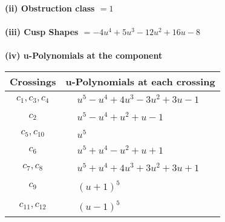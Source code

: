 \documentclass[1p]{elsarticle_modified}
\theoremstyle{definition}
\begin{document}
\flushleft \textbf{(ii) Obstruction class $= 1$}\\~\\
\flushleft \textbf{(iii) Cusp Shapes $= -4 u^4+5 u^3-12 u^2+16 u-8$}\\~\\
\newpage\renewcommand{\arraystretch}{1}
\flushleft \textbf{(iv) u-Polynomials at the component}\newline \\
\begin{tabular}{m{50pt}|m{274pt}}
Crossings & \hspace{64pt}u-Polynomials at each crossing \\
\hline $$\begin{aligned}c_{1},c_{3},c_{4}\end{aligned}$$&$\begin{aligned}
&u^5- u^4+4 u^3-3 u^2+3 u-1
\end{aligned}$\\
\hline $$\begin{aligned}c_{2}\end{aligned}$$&$\begin{aligned}
&u^5- u^4+u^2+u-1
\end{aligned}$\\
\hline $$\begin{aligned}c_{5},c_{10}\end{aligned}$$&$\begin{aligned}
&u^5
\end{aligned}$\\
\hline $$\begin{aligned}c_{6}\end{aligned}$$&$\begin{aligned}
&u^5+u^4- u^2+u+1
\end{aligned}$\\
\hline $$\begin{aligned}c_{7},c_{8}\end{aligned}$$&$\begin{aligned}
&u^5+u^4+4 u^3+3 u^2+3 u+1
\end{aligned}$\\
\hline $$\begin{aligned}c_{9}\end{aligned}$$&$\begin{aligned}
&(u+1)^5
\end{aligned}$\\
\hline $$\begin{aligned}c_{11},c_{12}\end{aligned}$$&$\begin{aligned}
&(u-1)^5
\end{aligned}$\\
\hline
\end{tabular}\\~\\
\end{document}
